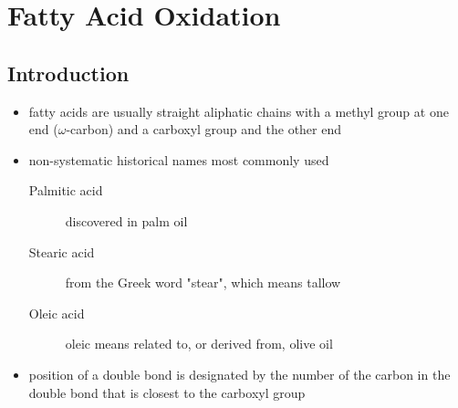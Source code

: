 \documentclass{scrartcl}
\begin{document}
\section{Fatty Acid Oxidation}
\label{sec:orgb38a215}
\subsection{Introduction}
\label{sec:orgececbe2}
\begin{itemize}
\item fatty acids are usually straight aliphatic chains with a methyl
group at one end (\(\omega\)-carbon) and a carboxyl group and the other
end
\end{itemize}


\begin{itemize}
\item non-systematic historical names most commonly used
\begin{description}
\item[{Palmitic acid}] discovered in palm oil
\item[{Stearic acid}] from the Greek word "stear", which means tallow
\item[{Oleic acid}] oleic means related to, or derived from, olive oil
\end{description}
\item position of a double bond is designated by the number of the carbon in the double bond that is closest to the carboxyl group
\end{itemize}
\end{document}
